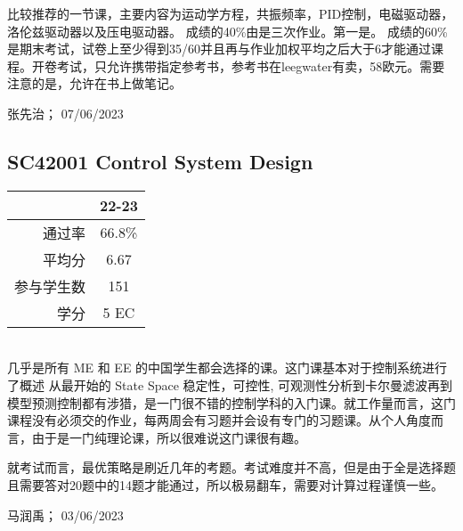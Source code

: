 比较推荐的一节课，主要内容为运动学方程，共振频率，PID控制，电磁驱动器，洛伦兹驱动器以及压电驱动器。
成绩的40\%由是三次作业。第一是。
成绩的60\%是期末考试，试卷上至少得到35/60并且再与作业加权平均之后大于6才能通过课程。开卷考试，只允许携带指定参考书，参考书在leegwater有卖，58欧元。需要注意的是，允许在书上做笔记。

\begin{flushright}
张先治； 07/06/2023
\end{flushright}

\subsection{SC42001 Control System Design}
\begin{minipage}{0.45\textwidth}
\centering
{}
\end{minipage}%
\begin{minipage}{0.45\textwidth}
\raggedleft
\begin{tabular}{r|c}
\textbf{ } & \textbf{22-23} \\ \hline
通过率 & 66.8\% \\ 
平均分 & 6.67 \\ 
参与学生数 & 151 \\ 
学分 & 5 EC\\
\end{tabular}
\end{minipage}\\

几乎是所有 ME 和 EE 的中国学生都会选择的课。这门课基本对于控制系统进行了概述 从最开始的 State Space 稳定性，可控性, 可观测性分析到卡尔曼滤波再到模型预测控制都有涉猎，是一门很不错的控制学科的入门课。就工作量而言，这门课程没有必须交的作业，每两周会有习题并会设有专门的习题课。从个人角度而言，由于是一门纯理论课，所以很难说这门课很有趣。

就考试而言，最优策略是刷近几年的考题。考试难度并不高，但是由于全是选择题且需要答对20题中的14题才能通过，所以极易翻车，需要对计算过程谨慎一些。
\begin{flushright}
马润禹； 03/06/2023
\end{flushright}

